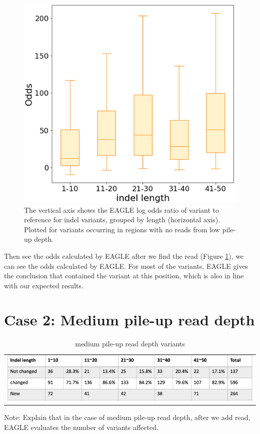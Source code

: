 \vspace{0.5cm}
\begin{figure}[H]
    \centering
    \includegraphics[width=0.6\columnwidth]{body/image/4-6.png}
    \captionsetup{labelfont=bf}
    \renewcommand{\baselinestretch}{1.0}
    \caption[no reads with variants from low pile-up depth odds ratio]{The vertical axis shows the EAGLE log odds ratio of variant to reference for indel variants, grouped by length (horizontal axis).  Plotted for variants occurring in regions with no reads from low pile-up depth.}
    \label{f4-6}
\end{figure}

Then see the odds calculated by EAGLE after we find the read (Figure \ref{f4-6}), we can see the odds calculated by EAGLE. For most of the variants, EAGLE gives the conclusion that contained the variant at this position, which is also in line with our expected results.


\section{Case 2: Medium pile-up read depth}
\begin{center}
\begin{table}[h]
    \centering
    \caption[medium pile-up read depth variants]{medium pile-up read depth variants}
    \vspace{-0.5cm}
    \begin{tabular}{c}
        \includegraphics[width=1\textwidth]{body/image/t4-4.png}
    \end{tabular}
    \label{t4-4}
    {Note: Explain that in the case of medium pile-up read depth, after we add read, EAGLE evaluates the number of variants affected.}
\end{table}
\end{center}


